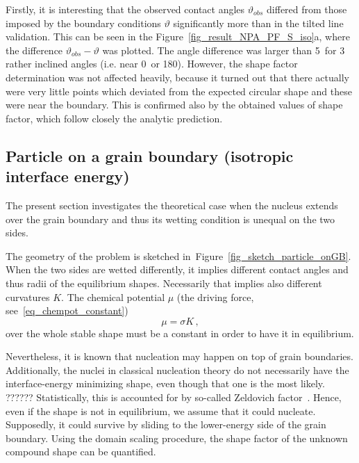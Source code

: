Firstly, it is interesting that the observed contact angles $\vartheta_{obs}$ differed from those imposed by the boundary conditions $\vartheta$ significantly more than in the tilted line validation. This can be seen in the Figure~\ref{fig_result_NPA_PF_S_iso}a, where the difference $\vartheta_{obs}-\vartheta$ was plotted. The angle difference was larger than 5\textdegree~for 3 rather inclined angles (i.e. near 0\textdegree~or 180\textdegree). However, the shape factor determination was not affected heavily, because it turned out that there actually were very little points which deviated from the expected circular shape and these were near the boundary. This is confirmed also by the obtained values of shape factor, which follow closely the analytic prediction. 

\subsection{Particle on a grain boundary (isotropic interface energy)}
The present section investigates the theoretical case when the nucleus extends over the grain boundary and thus its wetting condition is unequal on the two sides. 

The geometry of the problem is sketched in~Figure~\ref{fig_sketch_particle_onGB}. When the two sides are wetted differently, it implies different contact angles and thus radii of the equilibrium shapes. Necessarily that implies also different curvatures $K$. The chemical potential $\mu$ (the driving force, see~\eqref{eq_chempot_constant}) 
\begin{equation}
	\mu = \sigma K \,,
\end{equation}
over the whole stable shape must be a constant in order to have it in equilibrium.

Nevertheless, it is known that nucleation may happen on top of grain boundaries. Additionally, the nuclei in classical nucleation theory do not necessarily have the interface-energy minimizing shape, even though that one is the most likely. \alert{??????} Statistically, this is accounted for by so-called Zeldovich factor~\cite{Milchev2002}. Hence, even if the shape is not in equilibrium, we assume that it could nucleate. Supposedly, it could survive by sliding to the lower-energy side of the grain boundary. Using the domain scaling procedure, the shape factor of the unknown compound shape can be quantified.

